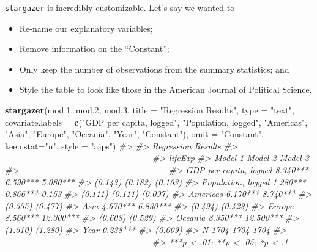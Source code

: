 \documentclass[]{book}
\newenvironment{Shaded}{\begin{snugshade}}{\end{snugshade}}
\newcommand{\KeywordTok}[1]{\textcolor[rgb]{0.13,0.29,0.53}{\textbf{#1}}}
\newcommand{\DataTypeTok}[1]{\textcolor[rgb]{0.13,0.29,0.53}{#1}}
\newcommand{\DecValTok}[1]{\textcolor[rgb]{0.00,0.00,0.81}{#1}}
\newcommand{\StringTok}[1]{\textcolor[rgb]{0.31,0.60,0.02}{#1}}
\newcommand{\CommentTok}[1]{\textcolor[rgb]{0.56,0.35,0.01}{\textit{#1}}}
\newcommand{\NormalTok}[1]{#1}
\providecommand{\tightlist}{%
  \setlength{\itemsep}{0pt}\setlength{\parskip}{0pt}}
\begin{document}
\texttt{stargazer} is incredibly customizable. Let's say we wanted to

\begin{itemize}
\tightlist
\item
  Re-name our explanatory variables;
\item
  Remove information on the ``Constant'';
\item
  Only keep the number of observations from the summary statistics; and
\item
  Style the table to look like those in the American Journal of
  Political Science.
\end{itemize}

\begin{Shaded}
\begin{Highlighting}[]
\KeywordTok{stargazer}\NormalTok{(mod.}\DecValTok{1}\NormalTok{, mod.}\DecValTok{2}\NormalTok{, mod.}\DecValTok{3}\NormalTok{, }\DataTypeTok{title =} \StringTok{"Regression Results"}\NormalTok{, }\DataTypeTok{type =} \StringTok{"text"}\NormalTok{, }
          \DataTypeTok{covariate.labels  =} \KeywordTok{c}\NormalTok{(}\StringTok{"GDP per capita, logged"}\NormalTok{, }\StringTok{"Population, logged"}\NormalTok{, }\StringTok{"Americas"}\NormalTok{, }\StringTok{"Asia"}\NormalTok{, }\StringTok{"Europe"}\NormalTok{, }\StringTok{"Oceania"}\NormalTok{, }\StringTok{"Year"}\NormalTok{, }\StringTok{"Constant"}\NormalTok{), }
          \DataTypeTok{omit =} \StringTok{"Constant"}\NormalTok{, }
          \DataTypeTok{keep.stat=}\StringTok{"n"}\NormalTok{, }\DataTypeTok{style =} \StringTok{"ajps"}\NormalTok{)}
\CommentTok{#> }
\CommentTok{#> Regression Results}
\CommentTok{#> --------------------------------------------------}
\CommentTok{#>                                  lifeExp          }
\CommentTok{#>                        Model 1  Model 2   Model 3 }
\CommentTok{#> --------------------------------------------------}
\CommentTok{#> GDP per capita, logged 8.340*** 6.590*** 5.080*** }
\CommentTok{#>                        (0.143)  (0.182)   (0.163) }
\CommentTok{#> Population, logged     1.280*** 0.866***   0.153  }
\CommentTok{#>                        (0.111)  (0.111)   (0.097) }
\CommentTok{#> Americas                        6.170*** 8.740*** }
\CommentTok{#>                                 (0.555)   (0.477) }
\CommentTok{#> Asia                            4.670*** 6.830*** }
\CommentTok{#>                                 (0.494)   (0.423) }
\CommentTok{#> Europe                          8.560*** 12.300***}
\CommentTok{#>                                 (0.608)   (0.529) }
\CommentTok{#> Oceania                         8.350*** 12.500***}
\CommentTok{#>                                 (1.510)   (1.280) }
\CommentTok{#> Year                                     0.238*** }
\CommentTok{#>                                           (0.009) }
\CommentTok{#> N                        1704     1704     1704   }
\CommentTok{#> --------------------------------------------------}
\CommentTok{#> ***p < .01; **p < .05; *p < .1}
\end{Highlighting}
\end{Shaded}
\end{document}

